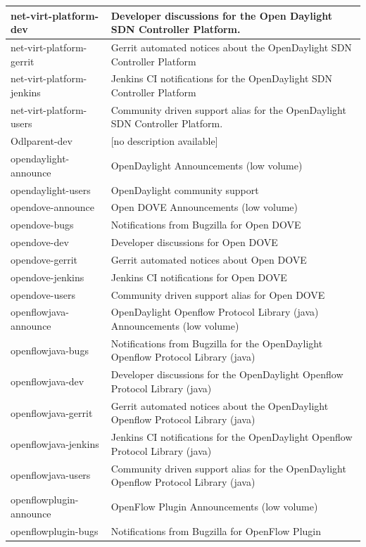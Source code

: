 \documentclass[a4paper, 12pt]{book}
\begin{document}
\begin{longtable}{|p{4cm}|p{10cm}|}
net-virt-platform-dev &	Developer discussions for the Open Daylight SDN Controller Platform. \\ \hline
net-virt-platform-gerrit &	Gerrit automated notices about the OpenDaylight SDN Controller Platform \\ \hline
net-virt-platform-jenkins &	Jenkins CI notifications for the OpenDaylight SDN Controller Platform \\ \hline
net-virt-platform-users &	Community driven support alias for the OpenDaylight SDN Controller Platform. \\ \hline
Odlparent-dev &	[no description available] \\ \hline
opendaylight-announce &	OpenDaylight Announcements (low volume) \\ \hline
opendaylight-users &	OpenDaylight community support \\ \hline
opendove-announce &	Open DOVE Announcements (low volume) \\ \hline
opendove-bugs &	Notifications from Bugzilla for Open DOVE \\ \hline
opendove-dev &	Developer discussions for Open DOVE \\ \hline
opendove-gerrit &	Gerrit automated notices about Open DOVE \\ \hline
opendove-jenkins &	Jenkins CI notifications for Open DOVE \\ \hline
opendove-users &	Community driven support alias for Open DOVE \\ \hline
openflowjava-announce &	OpenDaylight Openflow Protocol Library (java) Announcements (low volume) \\ \hline
openflowjava-bugs &	Notifications from Bugzilla for the OpenDaylight Openflow Protocol Library (java) \\ \hline
openflowjava-dev &	Developer discussions for the OpenDaylight Openflow Protocol Library (java) \\ \hline
openflowjava-gerrit &	Gerrit automated notices about the OpenDaylight Openflow Protocol Library (java) \\ \hline
openflowjava-jenkins &	Jenkins CI notifications for the OpenDaylight Openflow Protocol Library (java) \\ \hline
openflowjava-users &	Community driven support alias for the OpenDaylight Openflow Protocol Library (java) \\ \hline
openflowplugin-announce &	OpenFlow Plugin Announcements (low volume) \\ \hline
openflowplugin-bugs &	Notifications from Bugzilla for OpenFlow Plugin \\ \hline

\end{longtable}
\end{document}
